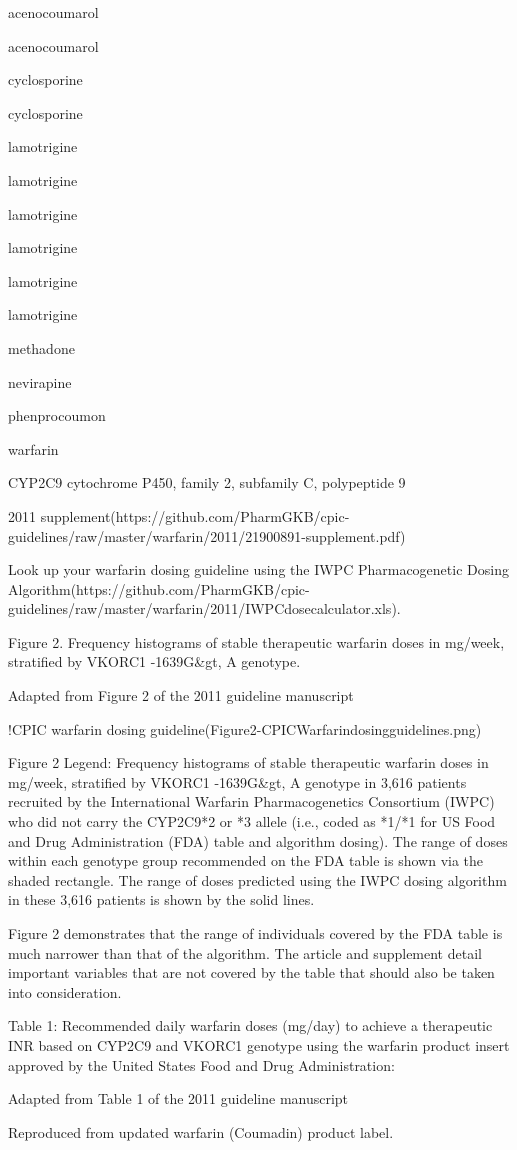 \documentclass{resume} %
\begin{document}
\begin{rSection}{ acenocoumarol }
\begin{rSection}{ acenocoumarol }
\begin{rSection}{ cyclosporine }
\begin{rSection}{ cyclosporine }
\begin{rSection}{ lamotrigine }
\begin{rSection}{ lamotrigine }
\begin{rSection}{ lamotrigine }
\begin{rSection}{ lamotrigine }
\begin{rSection}{ lamotrigine }
\begin{rSection}{ lamotrigine }
\begin{rSection}{ methadone }
\begin{rSection}{ nevirapine }
\begin{rSection}{ phenprocoumon }
\begin{rSection}{ warfarin }
\begin{rSubsection}{ CYP2C9 }{ cytochrome P450, family 2, subfamily C, polypeptide 9 }{}{}
\item 2011 supplement(https://github.com/PharmGKB/cpic-guidelines/raw/master/warfarin/2011/21900891-supplement.pdf)
 \newline
\item Look up your warfarin dosing guideline using the IWPC Pharmacogenetic Dosing Algorithm(https://github.com/PharmGKB/cpic-guidelines/raw/master/warfarin/2011/IWPCdosecalculator.xls).
 \newline
\item Figure 2. Frequency histograms of stable therapeutic warfarin doses in mg/week, stratified by VKORC1 -1639G&gt, A genotype.
 \newline
\item Adapted from Figure 2 of the 2011 guideline manuscript
 \newline
\item !CPIC warfarin dosing guideline(Figure2-CPICWarfarindosingguidelines.png)
 \newline
\item Figure 2 Legend: Frequency histograms of stable therapeutic warfarin doses in mg/week, stratified by VKORC1 -1639G&gt, A genotype in 3,616 patients recruited by the International Warfarin Pharmacogenetics Consortium (IWPC) who did not carry the CYP2C9*2 or *3 allele (i.e., coded as *1/*1 for US Food and Drug Administration (FDA) table and algorithm dosing). The range of doses within each genotype group recommended on the FDA table is shown via the shaded rectangle. The range of doses predicted using the IWPC dosing algorithm in these 3,616 patients is shown by the solid lines.
 \newline
\item Figure 2 demonstrates that the range of individuals covered by the FDA table is much narrower than that of the algorithm. The article and supplement detail important variables that are not covered by the table that should also be taken into consideration.
 \newline
\item Table 1: Recommended daily warfarin doses (mg/day) to achieve a therapeutic INR based on CYP2C9 and VKORC1 genotype using the warfarin product insert approved by the United States Food and Drug Administration:
 \newline
\item Adapted from Table 1 of the 2011 guideline manuscript
 \newline
\item Reproduced from updated warfarin (Coumadin) product label.

\end{rSubsection}
\end{rSection}
\end{rSection}
\end{rSection}
\end{rSection}
\end{rSection}
\end{rSection}
\end{rSection}
\end{rSection}
\end{rSection}
\end{rSection}
\end{rSection}
\end{rSection}
\end{rSection}
\end{rSection}
\end{document}
